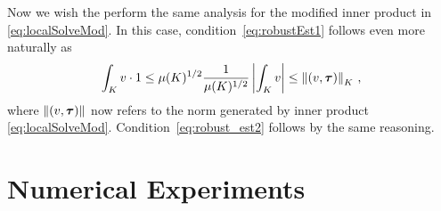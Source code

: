 \documentclass[Proposal.tex]{subfiles}
\begin{document}
Now we wish the perform the same analysis for the modified inner product in
\eqref{eq:localSolveMod}. In this case,
condition~\eqref{eq:robustEst1} follows even more naturally as
\begin{equation}
   \int_K v\cdot1\leq\mu(K)^{1/2}\frac{1}{\mu(K)^{1/2}}\left| \int_Kv \right|
   \leq\left\| (v,\boldsymbol\tau) \right\|_K\,,
   \label{eq:robustProof2}
\end{equation}
where $\left\| (v,\boldsymbol\tau) \right\|$ now refers to the norm generated by inner product
\eqref{eq:localSolveMod}. Condition~\eqref{eq:robust_est2} follows by the same
reasoning.

%                                                                                                                                                          
%                                                                                                                                                          
%                                                                                                                                                          


\section{Numerical Experiments}
\label{sec:lcNumerics}
\end{document}
